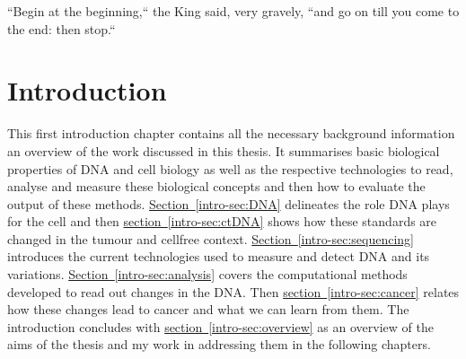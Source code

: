 
\begin{savequote}[85mm]
``Begin at the beginning,`` the King said, very gravely, ``and go on till you come to the end: then stop.``
\end{savequote}

\chapter{Introduction}
\label{ch:intro}


This first introduction chapter contains all the necessary background information  an overview of the work discussed in this thesis. It summarises  basic biological properties of DNA and cell biology as well as the respective technologies to read, analyse and measure these biological concepts and then how to evaluate the output of these methods.
\hyperref[intro-sec:DNA]{Section~\ref*{intro-sec:DNA}} delineates the role DNA plays for the cell and then \hyperref[intro-sec:ctDNA]{section~\ref{intro-sec:ctDNA}} shows how these standards are changed in the tumour and cell\add{-}free context. \hyperref[intro-sec:sequencing]{Section~\ref{intro-sec:sequencing}} introduces the current technologies used to measure and detect DNA and its variations. \hyperref[intro-sec:analysis]{Section~\ref*{intro-sec:analysis}} covers the computational methods developed to read out changes in the DNA. Then \hyperref[intro-sec:cancer]{section~\ref{intro-sec:cancer}} relates how these changes lead to cancer and what we can learn from them. 
The introduction concludes with \hyperref[intro-sec:overview]{section~\ref*{intro-sec:overview}} as an overview of the aims of the thesis and my work in addressing them in the following chapters.















